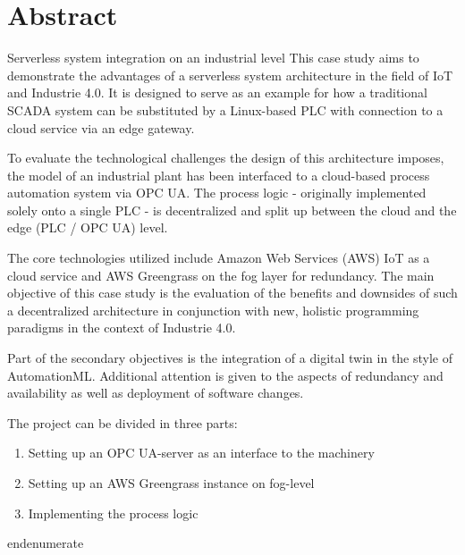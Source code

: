 
\section*{Abstract}
%

Serverless system integration on an industrial level
This case study aims to demonstrate the advantages of a serverless system architecture in the field of IoT and Industrie 4.0.
It is designed to serve as an example for how a traditional SCADA system can be substituted by a Linux-based PLC with connection to a cloud service via an edge gateway.

To evaluate the technological challenges the design of this architecture imposes, the model of an industrial plant has been interfaced to a cloud-based process automation system via OPC UA. The process logic - originally implemented solely onto a single PLC - is decentralized and split up between the cloud and the edge (PLC / OPC UA) level.

The core technologies utilized include Amazon Web Services (AWS) IoT as a cloud service and AWS Greengrass on the fog layer for redundancy.
The main objective of this case study is the evaluation of the benefits and downsides of such a decentralized architecture in conjunction with new, holistic programming paradigms in the context of Industrie 4.0.

Part of the secondary objectives is the integration of a digital twin in the style of AutomationML. Additional attention is given to the aspects of redundancy and availability as well as deployment of software changes.

The project can be divided in three parts:
\begin{enumerate}
  \item{Setting up an OPC UA-server as an interface to the machinery}
  \item{Setting up an AWS Greengrass instance on fog-level}
  \item{Implementing the process logic}
\end{enumerate}end{enumerate}
